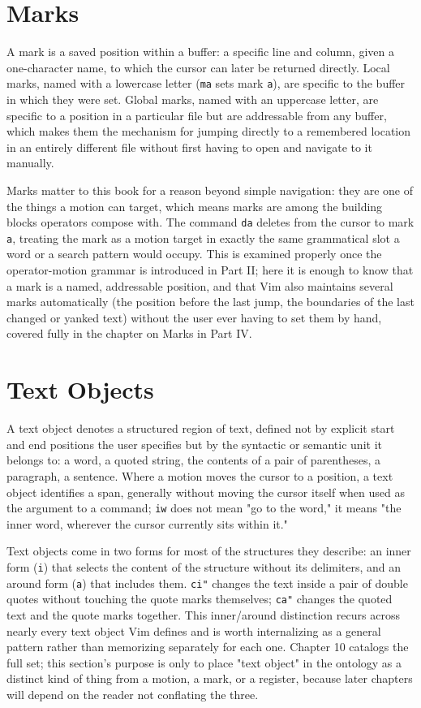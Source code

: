 \section{Marks}

A mark is a saved position within a buffer: a specific line and column, given a one-character name, to which the cursor can later be returned directly. Local marks, named with a lowercase letter (\texttt{ma} sets mark \texttt{a}), are specific to the buffer in which they were set. Global marks, named with an uppercase letter, are specific to a position in a particular file but are addressable from any buffer, which makes them the mechanism for jumping directly to a remembered location in an entirely different file without first having to open and navigate to it manually.

Marks matter to this book for a reason beyond simple navigation: they are one of the things a motion can target, which means marks are among the building blocks operators compose with. The command \texttt{d\textquotesingle a} deletes from the cursor to mark \texttt{a}, treating the mark as a motion target in exactly the same grammatical slot a word or a search pattern would occupy. This is examined properly once the operator-motion grammar is introduced in Part II; here it is enough to know that a mark is a named, addressable position, and that Vim also maintains several marks automatically (the position before the last jump, the boundaries of the last changed or yanked text) without the user ever having to set them by hand, covered fully in the chapter on Marks in Part IV.

\section{Text Objects}

A text object denotes a structured region of text, defined not by explicit start and end positions the user specifies but by the syntactic or semantic unit it belongs to: a word, a quoted string, the contents of a pair of parentheses, a paragraph, a sentence. Where a motion moves the cursor to a position, a text object identifies a span, generally without moving the cursor itself when used as the argument to a command; \texttt{iw} does not mean "go to the word," it means "the inner word, wherever the cursor currently sits within it."

Text objects come in two forms for most of the structures they describe: an inner form (\texttt{i}) that selects the content of the structure without its delimiters, and an around form (\texttt{a}) that includes them. \texttt{ci"} changes the text inside a pair of double quotes without touching the quote marks themselves; \texttt{ca"} changes the quoted text and the quote marks together. This inner/around distinction recurs across nearly every text object Vim defines and is worth internalizing as a general pattern rather than memorizing separately for each one. Chapter 10 catalogs the full set; this section's purpose is only to place "text object" in the ontology as a distinct kind of thing from a motion, a mark, or a register, because later chapters will depend on the reader not conflating the three.

